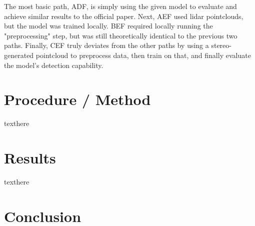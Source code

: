 The most basic path, ADF, is simply using the given model to evaluate and achieve similar results to the official paper. Next, AEF used lidar pointclouds, but the model was trained locally. BEF required locally running the "preprocessing" step, but was still theoretically identical to the previous two paths. Finally, CEF truly deviates from the other paths by using a stereo-generated pointcloud to preprocess data, then train on that, and finally evaluate the model's detection capability. 

\section{Procedure / Method}
texthere

\section{Results}
texthere

\section{Conclusion}
